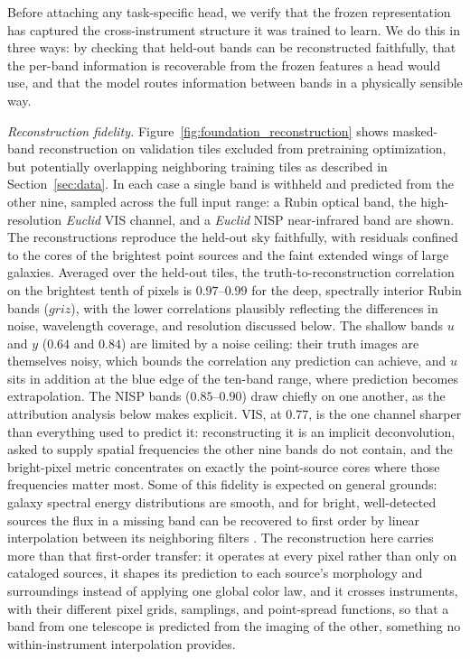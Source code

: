 \documentclass[twocolumn,linenumbers]{aastex701}
\begin{document}
Before attaching any task-specific head, we verify that the frozen representation has captured the cross-instrument structure it was trained to learn. We do this in three ways: by checking that held-out bands can be reconstructed faithfully, that the per-band information is recoverable from the frozen features a head would use, and that the model routes information between bands in a physically sensible way.

\textit{Reconstruction fidelity.} Figure~\ref{fig:foundation_reconstruction} shows masked-band reconstruction on validation tiles excluded from pretraining optimization, but potentially overlapping neighboring training tiles as described in Section~\ref{sec:data}. In each case a single band is withheld and predicted from the other nine, sampled across the full input range: a Rubin optical band, the high-resolution \textit{Euclid} VIS channel, and a \textit{Euclid} NISP near-infrared band are shown. The reconstructions reproduce the held-out sky faithfully, with residuals confined to the cores of the brightest point sources and the faint extended wings of large galaxies. Averaged over the held-out tiles, the truth-to-reconstruction correlation on the brightest tenth of pixels is $0.97$--$0.99$ for the deep, spectrally interior Rubin bands ($griz$), with the lower correlations plausibly reflecting the differences in noise, wavelength coverage, and resolution discussed below. The shallow bands $u$ and $y$ ($0.64$ and $0.84$) are limited by a noise ceiling: their truth images are themselves noisy, which bounds the correlation any prediction can achieve, and $u$ sits in addition at the blue edge of the ten-band range, where prediction becomes extrapolation. The NISP bands ($0.85$--$0.90$) draw chiefly on one another, as the attribution analysis below makes explicit. VIS, at $0.77$, is the one channel sharper than everything used to predict it: reconstructing it is an implicit deconvolution, asked to supply spatial frequencies the other nine bands do not contain, and the bright-pixel metric concentrates on exactly the point-source cores where those frequencies matter most. Some of this fidelity is expected on general grounds: galaxy spectral energy distributions are smooth, and for bright, well-detected sources the flux in a missing band can be recovered to first order by linear interpolation between its neighboring filters \citep{Hemmati2019}.
The reconstruction here carries more than that first-order transfer: it operates at every pixel rather than only on cataloged sources, it shapes its prediction to each source's morphology and surroundings instead of applying one global color law, and it crosses instruments, with their different pixel grids, samplings, and point-spread functions, so that a band from one telescope is predicted from the imaging of the other, something no within-instrument interpolation provides.
\end{document}
